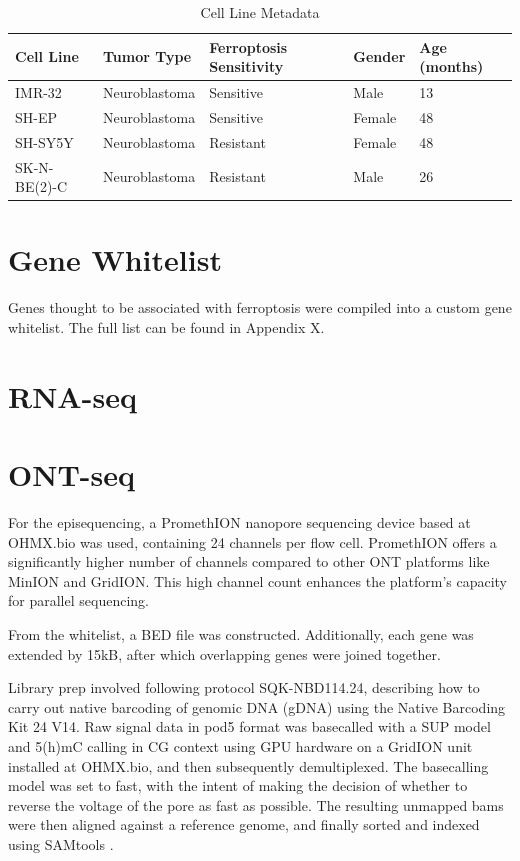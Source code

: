 \begin{table}[!ht]
    \centering
    \begin{adjustbox}{width=\textwidth}
    \begin{tabular}{|l|l|l|l|l|}
    \hline
        \bfseries Cell Line & \bfseries Tumor Type & \bfseries Ferroptosis Sensitivity & \bfseries Gender & \bfseries Age (months) \\ \hline
        IMR-32 & Neuroblastoma & Sensitive & Male & 13 \\ \hline
        SH-EP & Neuroblastoma & Sensitive & Female & 48 \\ \hline
        SH-SY5Y & Neuroblastoma & Resistant & Female & 48 \\ \hline
        SK-N-BE(2)-C & Neuroblastoma & Resistant & Male & 26 \\ \hline
    \end{tabular}
    \end{adjustbox}
    \caption{Cell Line Metadata}
    \label{tab:cellline_meta}
\end{table}

\section{Gene Whitelist}

Genes thought to be associated with ferroptosis were compiled into a custom gene whitelist. The full list can be found in Appendix X.

\section{RNA-seq}



\section{ONT-seq}

For the episequencing, a PromethION nanopore sequencing device based at OHMX.bio was used, containing 24 channels per flow cell. PromethION offers a significantly higher number of channels compared to other ONT platforms like MinION and GridION. This high channel count enhances the platform's capacity for parallel sequencing.

From the whitelist, a BED file was constructed. Additionally, each gene was extended by 15kB, after which overlapping genes were joined together.

Library prep involved following protocol SQK-NBD114.24, describing how to carry out native barcoding of genomic DNA (gDNA) using the Native Barcoding Kit 24 V14. Raw signal data in pod5 format was basecalled with a SUP model and 5(h)mC calling in CG context using GPU hardware on a GridION unit installed at OHMX.bio, and then subsequently demultiplexed. The basecalling model was set to fast, with the intent of making the decision of whether to reverse the voltage of the pore as fast as possible. The resulting unmapped bams were then aligned against a reference genome, and finally sorted and indexed using SAMtools \citep{samtools}.

